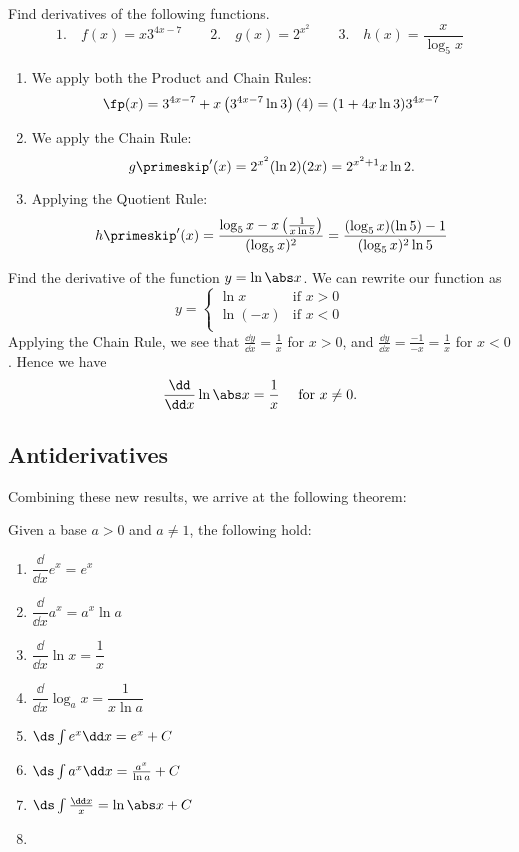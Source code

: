\begin{example}\label{ex_find_d_exp_log}%
Find derivatives of the following functions.
\[
 \text{1.}\quad f(x)=x3^{4x-7}\qquad
 \text{2.}\quad g(x)=2^{x^2}\qquad
 \text{3.}\quad h(x)=\frac x{\log_5x}
\]
\solution
\begin{enumerate}
\item We apply both the Product and Chain Rules:
\[\fp(x)=3^{4x-7}+x\left(3^{4x-7}\ln 3\right)(4)=(1+4x\ln 3)3^{4x-7}\]
\item We apply the Chain Rule:
\[g\primeskip'(x)=2^{x^2}(\ln 2)(2x)=2^{x^2+1}x\ln2.\]
\item Applying the Quotient Rule:
\[h\primeskip'(x)=\frac{\log_5x-x\left(\frac1{x\ln 5}\right)}{(\log_5x)^2}=\frac{(\log_5x)(\ln 5)-1}{(\log_5x)^2\ln 5}\]
\end{enumerate}
\end{example}

\begin{example}\label{ex_d_ln_abs_x}%
Find the derivative of the function $y=\ln\abs x$.
\solution
We can rewrite our function as
\[y=\begin{cases} \ln x & \text{if $x>0$}\\ \ln(-x) & \text{if $x<0$}\\ \end{cases}\]
Applying the Chain Rule, we see that $\frac{\dd y}{\dd x}=\frac 1x$ for $x>0$, and $\frac{\dd y}{\dd x}=\frac{-1}{-x}=\frac 1x$ for $x<0$. Hence we have
\[\frac{\dd}{\dd x}\ln\abs x=\frac 1x \quad\text{ for $x\neq0$.}\]
\end{example}

\subsection{Antiderivatives}

Combining these new results, we arrive at the following theorem:

\begin{theorem}\label{thm_int_exp_log}%
Given a base $a>0$ and $a\neq 1$, the following hold:\\[-1.5\baselineskip]
\begin{multicols}{2}
\begin{enumerate}
\item $\dfrac\dd{\dd x}e^x=e^x$
\item $\dfrac\dd{\dd x}a^x=a^x\ln a$
\item $\dfrac\dd{\dd x}\ln x=\dfrac1x$
\item $\dfrac\dd{\dd x}\log_a x=\dfrac1{x\ln a}$
\item $\ds\int e^x\dd x=e^x+C$
\item $\ds\int a^x\dd x=\frac{a^x}{\ln a}+C$
\item $\ds\int \frac{\dd x}{x}=\ln\abs x+C$
\item[]
\end{enumerate}
\end{multicols}
\end{theorem}

